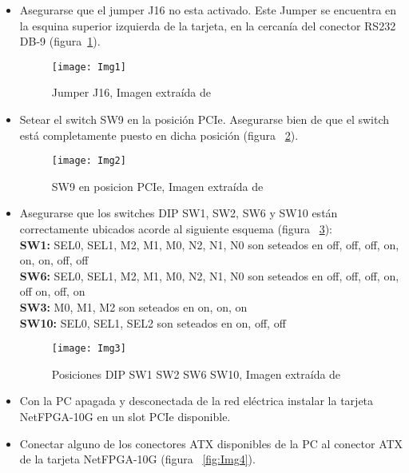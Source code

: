 \begin{itemize}
\item Asegurarse que el jumper J16 no esta activado. Este Jumper se encuentra en la esquina superior izquierda de la tarjeta, en la cercanía del conector RS232 DB-9 (figura~\ref{fig:Img1}).

\begin{figure}[h!] 
\centering    
\texttt{[image: Img1]}
\caption[Jumper J16]{Jumper J16, Imagen extra\'ida de \citep{NetFPGA6}}
\label{fig:Img1}
\end{figure}

\item Setear el switch SW9 en la posición PCIe. Asegurarse bien de que el switch est\'a completamente puesto en dicha posición (figura ~\ref{fig:Img2}).

\begin{figure}[h!] 
\centering    
\texttt{[image: Img2]}
\caption[SW9 en posicion PCIe]{SW9 en posicion PCIe, Imagen extra\'ida de \citep{NetFPGA6}}
\label{fig:Img2}
\end{figure}

\newpage
\item Asegurarse que los switches DIP SW1, SW2, SW6 y SW10 están correctamente ubicados acorde al siguiente esquema (figura ~\ref{fig:Img3}):\\

\textbf{SW1:} SEL0, SEL1, M2, M1, M0, N2, N1, N0 son seteados en off, off, off, on, on, on, off, off\\
\textbf{SW6:} SEL0, SEL1, M2, M1, M0, N2, N1, N0 son seteados en off, off, off, on, off on, off, on\\
\textbf{SW3:} M0, M1, M2 son seteados en on, on, on\\
\textbf{SW10:} SEL0, SEL1, SEL2 son seteados en on, off, off\\

\begin{figure}[htbp!] 
\centering    
\texttt{[image: Img3]}
\caption[Posiciones DIP SW1 SW2 SW6 SW10]{Posiciones DIP SW1 SW2 SW6 SW10, Imagen extra\'ida de \citep{NetFPGA6}}
\label{fig:Img3}
\end{figure}

\item Con la PC apagada y desconectada de la red el\'ectrica instalar la tarjeta NetFPGA-10G en un slot PCIe disponible.

\item Conectar alguno de los conectores ATX disponibles de la PC al conector ATX de la tarjeta NetFPGA-10G (figura ~\ref{fig:Img4}).


\end{itemize}
